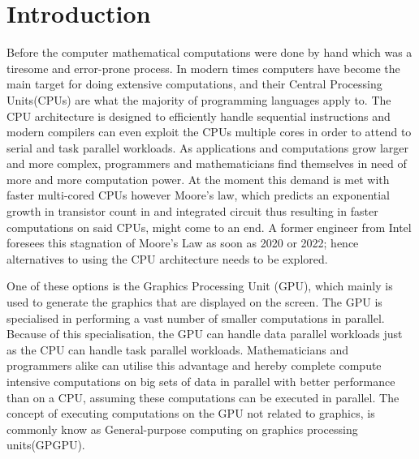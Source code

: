 \chapter{Introduction} %
\label{cha:introduction}
Before the computer mathematical computations were done by hand which was a tiresome and error-prone process.
In modern times computers have become the main target for doing extensive computations, and their Central Processing Units(CPUs) are what the majority of programming languages apply to.
The CPU architecture is designed to efficiently handle sequential instructions and modern compilers can even exploit the CPUs multiple cores in order to attend to serial and task parallel workloads.
As applications and computations grow larger and more complex, programmers and mathematicians find themselves in need of more and more computation power.\citep[pp. 4]{OpenCL_AMD}
At the moment this demand is met with faster multi-cored CPUs however Moore's law, which predicts an exponential growth in transistor count in and integrated circuit thus resulting in faster computations on said CPUs, might come to an end.
A former engineer from Intel foresees this stagnation of Moore's Law as soon as 2020 or 2022; hence alternatives to using the CPU architecture needs to be explored. \citep{Moore2013}

One of these options is the Graphics Processing Unit (GPU), which mainly is used to generate the graphics that are displayed on the screen.
The GPU is specialised in performing a vast number of smaller computations in parallel.
Because of this specialisation, the GPU can handle data parallel workloads just as the CPU can handle task parallel workloads.
Mathematicians and programmers alike can utilise this advantage and hereby complete compute intensive computations on big sets of data in parallel with better performance than on a CPU, assuming these computations can be executed in parallel.
The concept of executing computations on the GPU not related to graphics, is commonly know as General-purpose computing on graphics processing units(GPGPU).


